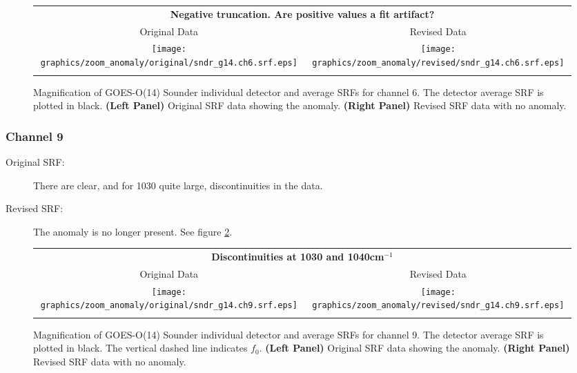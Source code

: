 \begin{figure}[htp]
  \centering
  \begin{tabular}{c c}
    \multicolumn{2}{c}{\textsf{\bfseries Negative truncation. Are positive values a fit artifact?}} \\
    \hspace{2.0em}\textsf{Original Data} &
    \hspace{2.0em}\textsf{Revised Data} \\
    \texttt{[image: graphics/zoom\_anomaly/original/sndr\_g14.ch6.srf.eps]} &
    \texttt{[image: graphics/zoom\_anomaly/revised/sndr\_g14.ch6.srf.eps]} \\\\
  \end{tabular}
  \caption{Magnification of GOES-O(14) Sounder individual detector and average SRFs for channel 6. The detector average SRF is plotted in black. \textbf{(Left Panel)} Original SRF data showing the anomaly. \textbf{(Right Panel)} Revised SRF data with no anomaly.}
  \label{fig:sndr_g14.ch6.anomaly}
\end{figure}

\subsubsection{Channel 9}
\begin{description}
  \item[Original SRF:] There are clear, and for 1030\invcm{} quite large, discontinuities in the data.
  \item[Revised SRF:]  The anomaly is no longer present. See figure \ref{fig:sndr_g14.ch9.anomaly}.
\end{description}

\begin{figure}[htp]
  \centering
  \begin{tabular}{c c}
    \multicolumn{2}{c}{\textsf{\bfseries Discontinuities at 1030 and 1040cm$^{-1}$}} \\
    \hspace{1.5em}\textsf{Original Data} &
    \hspace{1.5em}\textsf{Revised Data} \\
    \texttt{[image: graphics/zoom\_anomaly/original/sndr\_g14.ch9.srf.eps]} &
    \texttt{[image: graphics/zoom\_anomaly/revised/sndr\_g14.ch9.srf.eps]} \\\\
  \end{tabular}
  \caption{Magnification of GOES-O(14) Sounder individual detector and average SRFs for channel 9. The detector average SRF is plotted in black. The vertical dashed line indicates $f_0$. \textbf{(Left Panel)} Original SRF data showing the anomaly. \textbf{(Right Panel)} Revised SRF data with no anomaly.}
  \label{fig:sndr_g14.ch9.anomaly}
\end{figure}

